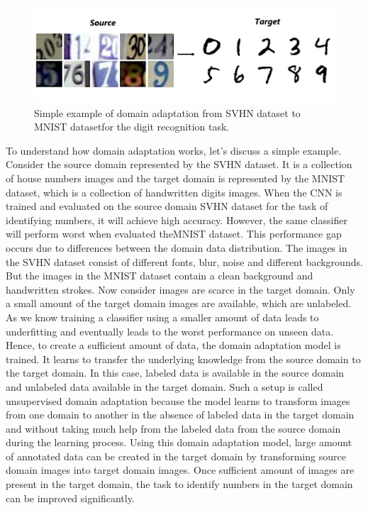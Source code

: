 \begin{figure}[H]
        \begin{center}
 	    \includegraphics[scale=0.15]{images/Introduction/DA.png}
	    \caption[Simple example of domain adaptation from \ac{SVHN} dataset to \ac{MNIST} dataset for the digit recognition task.]{Simple example of domain adaptation from \ac{SVHN} dataset \cite{37648} to \ac{MNIST} dataset\footnotemark for the digit recognition task.\footnotemark}
	    \label{fig:DA}
	    \end{center}
\end{figure}


To understand how domain adaptation works, let's discuss a simple example. Consider the source domain represented by the \ac{SVHN} dataset. It is a collection of house numbers images and the target domain is represented by the \ac{MNIST} dataset, which is a collection of handwritten digits images. When the \ac{CNN} is trained and evaluated on the source domain \ac{SVHN} dataset for the task of identifying numbers, it will achieve high accuracy. However, the same classifier will perform worst when evaluated the\ac{MNIST} dataset. This performance gap occurs due to differences between the domain data distribution. The images in the \ac{SVHN} dataset consist of different fonts, blur, noise and different backgrounds. But the images in the \ac{MNIST} dataset contain a clean background and handwritten strokes. Now consider images are scarce in the target domain. Only a small amount of the target domain images are available, which are unlabeled. As we know training a classifier using a smaller amount of data leads to underfitting and eventually leads to the worst performance on unseen data. Hence, to create a sufficient amount of data, the domain adaptation model is trained. It learns to transfer the underlying knowledge from the source domain to the target domain. In this case, labeled data is available in the source domain and unlabeled data available in the target domain. Such a setup is called unsupervised domain adaptation because the model learns to transform images from one domain to another in the absence of labeled data in the target domain and without taking much help from the labeled data from the source domain during the learning process. Using this domain adaptation model, large amount of annotated data can be created in the target domain by transforming source domain images into target domain images. Once sufficient amount of images are present in the target domain, the task to identify numbers in the target domain can be improved significantly. 

